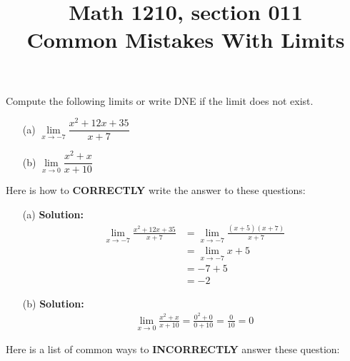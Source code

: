 \documentclass[reqno,psamsfonts]{amsart}
\title{Math 1210, section 011\\Common Mistakes With Limits}
\theoremstyle{definition}
\theoremstyle{remark}
\numberwithin{equation}{section}
\begin{document}
\maketitle
\thispagestyle{empty}
Compute the following limits or write DNE if the limit does not exist.
\begin{enumerate}
\item[(a)] $\lim\limits_{x\to -7}\dfrac{x^2+12x+35}{x+7}$
\\
\item[(b)] $\lim\limits_{x\to 0}\dfrac{x^2+x}{x+10}$
\end{enumerate}
\vspace{1em}
Here is how to \textbf{CORRECTLY} write the answer to these questions:
\begin{enumerate}
\item[(a)] \textbf{Solution:}
\begin{align*}
\lim\limits_{x\to -7}\frac{x^2+12x+35}{x+7}&=\lim\limits_{x\to-7}\frac{(x+5)(x+7)}{x+7}\\
&=\lim\limits_{x\to -7}x+5\\
&=-7+5\\
&=-2
\end{align*}

\item[(b)] \textbf{Solution:}
\begin{align*}
\lim\limits_{x\to 0}\frac{x^2+x}{x+10}=\frac{0^2+0}{0+10}=\frac{0}{10}=0
\end{align*}
\end{enumerate}
\vspace{2em}
Here is a list of common ways to \textbf{INCORRECTLY} answer these question:
\end{document}
